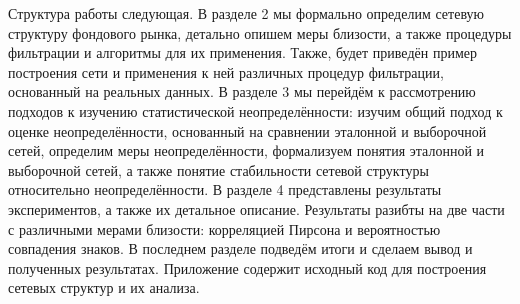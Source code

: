 Структура работы следующая. В разделе 2 мы формально определим сетевую структуру фондового рынка, детально опишем меры близости, а также процедуры фильтрации и алгоритмы для их применения. Также, будет приведён пример построения сети и применения к ней различных процедур фильтрации, основанный на реальных данных. В разделе 3 мы перейдём к рассмотрению подходов к изучению статистической неопределённости: изучим общий подход к оценке неопределённости, основанный на сравнении эталонной и выборочной сетей, определим меры неопределённости, формализуем понятия эталонной и выборочной сетей, а также понятие стабильности сетевой структуры относительно неопределённости. В разделе 4 представлены результаты экспериментов, а также их детальное описание. Результаты разибты на две части с различными мерами близости: корреляцией Пирсона и вероятностью совпадения знаков. В последнем разделе подведём итоги и сделаем вывод и полученных результатах. Приложение содержит исходный код для построения сетевых структур и их анализа.


